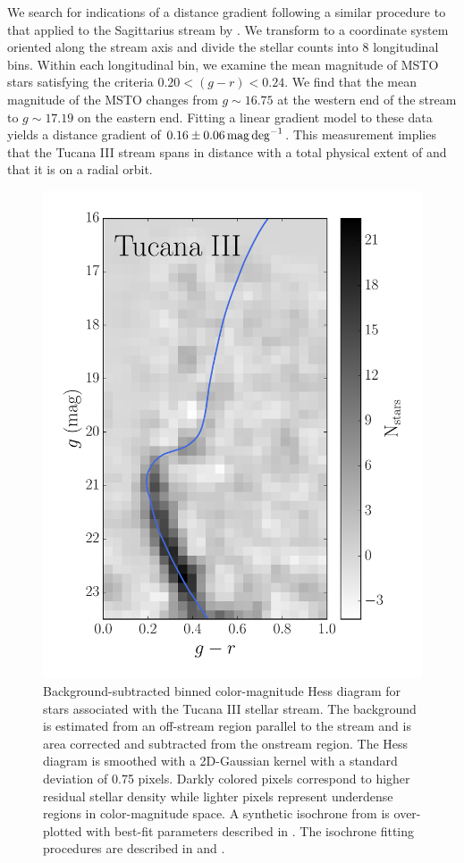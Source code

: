 \documentclass[twocolumn]{aastex61}
\begin{document}
We search for indications of a distance gradient following a similar procedure to that applied to the Sagittarius stream by \citet{Koposov:2012}. 
We transform to a coordinate system oriented along the stream axis and divide the stellar counts into 8 longitudinal bins.
Within each longitudinal bin, we examine the mean magnitude of MSTO stars satisfying the criteria $0.20 < (g-r) < 0.24$.
We find that the mean magnitude of the MSTO changes from $g \sim 16.75$ at the western end of the stream to $g \sim 17.19$ on the eastern end. 
Fitting a linear gradient model to these data yields a distance gradient of $0.16 \pm 0.06 \mathrm{\,mag} \deg^{-1}$. 
This measurement implies that the Tucana III stream spans \CHECK{$\roughly 4\kpc$} in distance with a total physical extent of \CHECK{$\roughly 4.5 \kpc$} and that it is on a radial orbit.

\begin{figure}
\centering
\includegraphics[width=0.7\columnwidth]{Hess_Tucana}
\caption{Background-subtracted binned color-magnitude Hess diagram for stars associated with the Tucana III stellar stream. 
The background is estimated from an off-stream region parallel to the stream and is area corrected and subtracted from the onstream region.
The Hess diagram is smoothed with a 2D-Gaussian kernel with a standard deviation of 0.75 pixels.
Darkly colored pixels correspond to higher residual stellar density while lighter pixels represent underdense regions in color-magnitude space.
A synthetic isochrone from \citet{Dotter:2008} is over-plotted with best-fit parameters described in .
The isochrone fitting procedures are described in  and .
}
\label{fig:tucana}
\end{figure}
\end{document}
